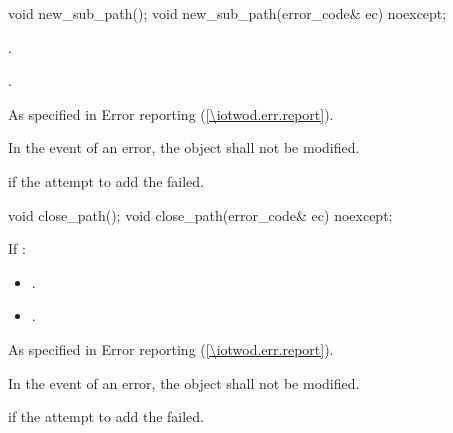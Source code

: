 \begin{itemdecl}
    void new_sub_path();
    void new_sub_path(error_code& ec) noexcept;
\end{itemdecl}
\begin{itemdescr}
	\pnum
	\effects
	.
	
	\pnum
	.
	
	\pnum
	\throws
	As specified in Error reporting (\ref{\iotwod.err.report}).

	\pnum
	\remarks
	In the event of an error, the object shall not be modified.

	\pnum
	\errors
	 if the attempt to add the  failed.
\end{itemdescr}

\begin{itemdecl}
    void close_path();
    void close_path(error_code& ec) noexcept;
\end{itemdecl}
\begin{itemdescr}
	\pnum
	\effects
	If :
	\begin{itemize}
	\item {}.
	
	\item {}.
	\end{itemize}
	
	\pnum
	\throws
	As specified in Error reporting (\ref{\iotwod.err.report}).

	\pnum
	\remarks
	In the event of an error, the object shall not be modified.

	\pnum
	\errors
	 if the attempt to add the  failed.
\end{itemdescr}

